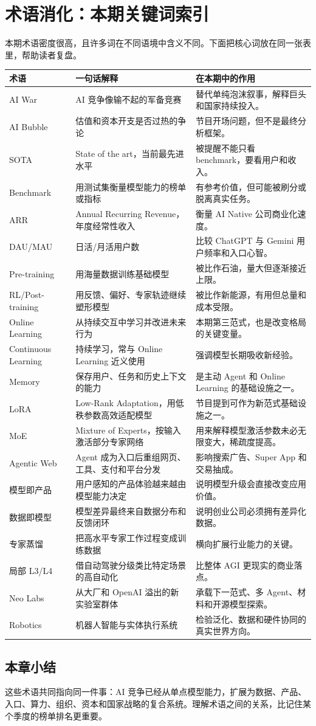 \section{术语消化：本期关键词索引}

本期术语密度很高，且许多词在不同语境中含义不同。下面把核心词放在同一张表里，帮助读者复盘。

\begin{longtable}{p{}p{}p{}}
\toprule
术语 & 一句话解释 & 在本期中的作用 \\
\midrule
AI War & AI 竞争像输不起的军备竞赛 & 替代单纯泡沫叙事，解释巨头和国家持续投入。 \\
AI Bubble & 估值和资本开支是否过热的争论 & 节目开场问题，但不是最终分析框架。 \\
SOTA & State of the art，当前最先进水平 & 被提醒不能只看 benchmark，要看用户和收入。 \\
Benchmark & 用测试集衡量模型能力的榜单或指标 & 有参考价值，但可能被刷分或脱离真实任务。 \\
ARR & Annual Recurring Revenue，年度经常性收入 & 衡量 AI Native 公司商业化速度。 \\
DAU/MAU & 日活/月活用户数 & 比较 ChatGPT 与 Gemini 用户频率和入口心智。 \\
Pre-training & 用海量数据训练基础模型 & 被比作石油，量大但逐渐接近上限。 \\
RL/Post-training & 用反馈、偏好、专家轨迹继续塑形模型 & 被比作新能源，有用但总量和成本受限。 \\
Online Learning & 从持续交互中学习并改进未来行为 & 本期第三范式，也是改变格局的关键变量。 \\
Continuous Learning & 持续学习，常与 Online Learning 近义使用 & 强调模型长期吸收新经验。 \\
Memory & 保存用户、任务和历史上下文的能力 & 是主动 Agent 和 Online Learning 的基础设施之一。 \\
LoRA & Low-Rank Adaptation，用低秩参数高效适配模型 & 节目提到可作为新范式基础设施之一。 \\
MoE & Mixture of Experts，按输入激活部分专家网络 & 用来解释模型激活参数未必无限变大，稀疏度提高。 \\
Agentic Web & Agent 成为入口后重组网页、工具、支付和平台分发 & 影响搜索广告、Super App 和交易抽成。 \\
模型即产品 & 用户感知的产品体验越来越由模型能力决定 & 说明模型升级会直接改变应用价值。 \\
数据即模型 & 模型差异最终来自数据分布和反馈闭环 & 说明创业公司必须拥有差异化数据。 \\
专家蒸馏 & 把高水平专家工作过程变成训练数据 & 横向扩展行业能力的关键。 \\
局部 L3/L4 & 借自动驾驶分级类比特定场景的高自动化 & 比整体 AGI 更现实的商业落点。 \\
Neo Labs & 从大厂和 OpenAI 溢出的新实验室群体 & 承载下一范式、多 Agent、材料和开源模型探索。 \\
Robotics & 机器人智能与实体执行系统 & 检验泛化、数据和硬件协同的真实世界方向。 \\
\bottomrule
\end{longtable}

\subsection{本章小结}

这些术语共同指向同一件事：AI 竞争已经从单点模型能力，扩展为数据、产品、入口、算力、组织、资本和国家战略的复合系统。理解术语之间的关系，比记住某个季度的榜单排名更重要。

